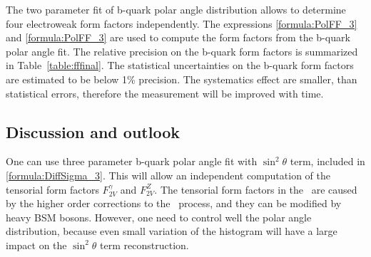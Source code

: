 The two parameter fit of b-quark polar angle distribution allows to determine four electroweak form factors independently.
The expressions \ref{formula:PolFF_3} and \ref{formula:PolFF_3} are used to compute the form factors from the b-quark polar angle fit. 
The relative precision on the b-quark form factors is summarized in Table~\ref{table:fffinal}. 
The statistical uncertainties on the b-quark form factors are estimated to be below 1\% precision.
The systematics effect are smaller, than statistical errors, therefore the measurement will be improved with time. 






\subsection{Discussion and outlook}

One can use three parameter b-quark polar angle fit with $\sin^2 \theta$ term, included in \ref{formula:DiffSigma_3}. 
This will allow an independent computation of the tensorial form factors $F^\gamma_{2V}$ and $F^Z_{2V}$.
The tensorial form factors in the \sm\ are caused by the higher order corrections to the \bbbar\ process, and they can be modified by  heavy BSM bosons. 
However, one need to control well the polar angle distribution, because  even small variation of the histogram will have a large impact on the $\sin^2 \theta$ term reconstruction.

